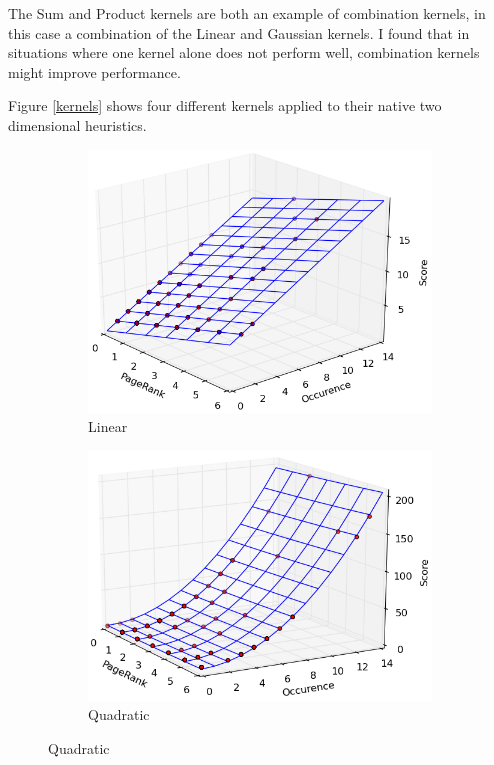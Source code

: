 \documentclass[12pt,notitlepage,twoside]{scrbook}
\begin{document}
The Sum and Product kernels are both an example of combination kernels, in this case a
combination of the Linear and Gaussian kernels. I found that in situations
where one kernel alone does not perform well, combination kernels might improve performance.

Figure \ref{kernels} shows four different kernels applied to their native two dimensional heuristics. 
\begin{figure}[h!]
\centering
\begin{subfigure}[b]{.49\textwidth}
  \centering
  \includegraphics[width= \linewidth]{figs/lin.png}
  \caption{Linear}
  \label{lin}
\end{subfigure}
\begin{subfigure}[b]{.49\textwidth}
  \centering
  \includegraphics[width=\linewidth]{figs/quad.png}
  \caption{Quadratic}
  \label{quad}
\end{subfigure}


\end{figure}
\end{document}

